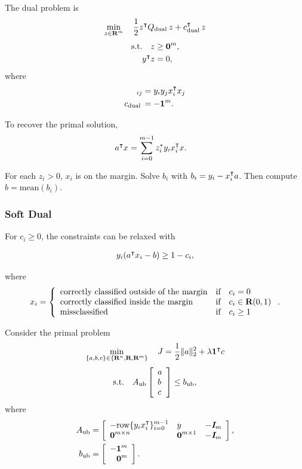 \documentclass{article}
\begin{document}
    The dual problem is \cite[p.~313]{ml}
    \begin{align*}
        \min_{z\in\textbf{R}^m}\quad \frac{1}{2}z^\intercal Q_{\text{dual}\:} z+c_{\text{dual}\:}^\intercal z
    \end{align*}
    \begin{align*}
        \text{s.t.}\quad z&\geq \textbf{0}^m,\\
        y^\intercal z &=0,
    \end{align*}
    where
    \begin{align*}
        [Q_{\text{dual}\:}]_{ij}
        &=y_i y_j x_i^\tp x_j \\
        c_{\text{dual}\:}&=-\ones^m.
    \end{align*}

    To recover the primal solution,
    \begin{align*}
        a^\intercal x &= \sum_{i=0}^{m-1} z_i^* y_i x_i^\intercal x.
    \end{align*}

    For each $z_i>0$, $x_i$ is on the margin. Solve $b_i$ with $b_i=y_i-x_i^\intercal a$.
    Then compute $b=\text{mean}(b_i)$.

    \clearpage
\subsubsection{Soft Dual}

    For $c_i\geq0$, the constraints can be relaxed with 

    \begin{align*}
        y_i(a^\intercal x_i - b)\geq 1-c_i,
    \end{align*}

    where
    \begin{align*}
        x_i=\left\{\begin{array}{lllllllllllllllllll}
            \text{correctly classified outside of the margin} & \text{if}\quad c_i=0\\
            \text{correctly classified inside the margin} & \text{if}\quad c_i\in\textbf{R}(0,1)\\
            \text{missclassified} &  \text{if}\quad c_i\geq1
            \end{array}\right..
    \end{align*}    

    Consider the primal problem
    \begin{align*}
        \min_{\{a,b,c\}\in\{\textbf{R}^n,\textbf{R},\textbf{R}^m\}}\quad J = \frac{1}{2}\|a\|_2^2+\lambda \textbf{1}^\intercal c
    \end{align*}
    \begin{align*}
        \text{s.t.}\quad A_{\text{ub}}\left[\begin{array}{lllllllllllllllllll}a\\ b\\c\end{array}\right]\leq b_{\text{ub}},
    \end{align*}
    where
    \begin{align*}
        A_\ub&= \mat{-\row\{y_ix_i^\tp\}_{i=0}^{m-1} & y &-\eye_m\\
        \zeros^{m\times n} & \zeros^{m\times 1} & -\eye_m},\\
        b_\ub&=\mat{-\ones^m\\ \minus \zeros^m}.
    \end{align*}
\end{document}
